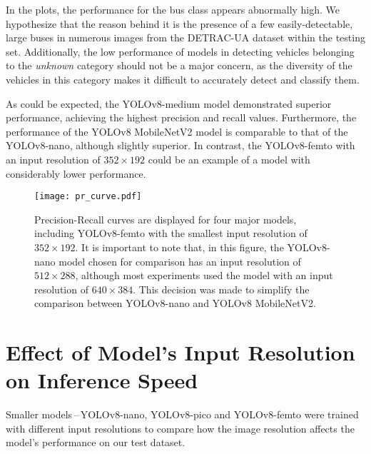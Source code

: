 In the plots, the performance for the bus class appears abnormally high. We
hypothesize that the reason behind it is the presence of a few
easily-detectable, large buses in numerous images from the DETRAC-UA dataset
within the testing set. Additionally, the low performance of models in detecting
vehicles belonging to the \textit{unknown} category should not be a major
concern, as the diversity of the vehicles in this category makes it difficult to
accurately detect and classify them.

As could be expected, the YOLOv8-medium model demonstrated superior performance,
achieving the highest precision and recall values. Furthermore, the performance
of the YOLOv8 MobileNetV2 model is comparable to that of the YOLOv8-nano,
although slightly superior. In contrast, the YOLOv8-femto with an input
resolution of $352 \times 192$ could be an example of a model with considerably
lower performance.

\begin{figure}[H]
    \begin{framed}
        \centering
        \texttt{[image: pr\_curve.pdf]}
        \caption{Precision-Recall curves are displayed for four major models,
        including YOLOv8-femto with the smallest input resolution of $352 \times 192$. It
        is important to note that, in this figure, the YOLOv8-nano model chosen for
        comparison has an input resolution of $512 \times 288$, although most experiments
        used the model with an input resolution of $640 \times 384$. This decision was
        made to simplify the comparison between YOLOv8-nano and YOLOv8 MobileNetV2.}
        \label{PRCurveMajor}
    \end{framed}
\end{figure}






\section{Effect of Model's Input Resolution on Inference Speed}
\label{InputResolutionVSFPSExperiment}

Smaller models\,--\,YOLOv8-nano, YOLOv8-pico and YOLOv8-femto were trained with
different input resolutions to compare how the image resolution affects
the model's performance on our test dataset.

